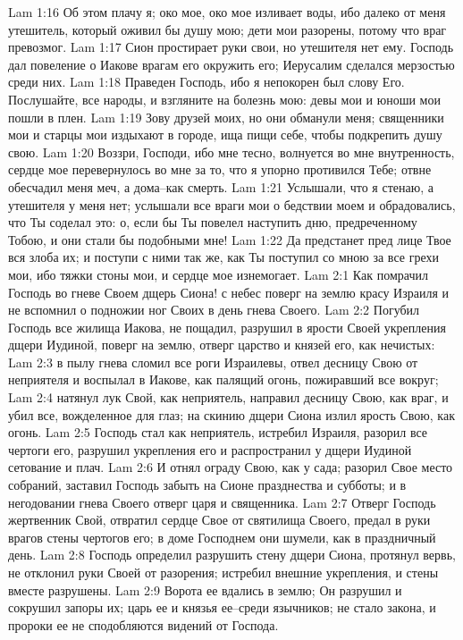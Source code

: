 Lam 1:16  Об этом плачу я; око мое, око мое изливает воды, ибо далеко от меня утешитель, который оживил бы душу мою; дети мои разорены, потому что враг превозмог.
Lam 1:17  Сион простирает руки свои, но утешителя нет ему. Господь дал повеление о Иакове врагам его окружить его; Иерусалим сделался мерзостью среди них.
Lam 1:18  Праведен Господь, ибо я непокорен был слову Его. Послушайте, все народы, и взгляните на болезнь мою: девы мои и юноши мои пошли в плен.
Lam 1:19  Зову друзей моих, но они обманули меня; священники мои и старцы мои издыхают в городе, ища пищи себе, чтобы подкрепить душу свою.
Lam 1:20  Воззри, Господи, ибо мне тесно, волнуется во мне внутренность, сердце мое перевернулось во мне за то, что я упорно противился Тебе; отвне обесчадил меня меч, а дома--как смерть.
Lam 1:21  Услышали, что я стенаю, а утешителя у меня нет; услышали все враги мои о бедствии моем и обрадовались, что Ты соделал это: о, если бы Ты повелел наступить дню, предреченному Тобою, и они стали бы подобными мне!
Lam 1:22  Да предстанет пред лице Твое вся злоба их; и поступи с ними так же, как Ты поступил со мною за все грехи мои, ибо тяжки стоны мои, и сердце мое изнемогает.
Lam 2:1  Как помрачил Господь во гневе Своем дщерь Сиона! с небес поверг на землю красу Израиля и не вспомнил о подножии ног Своих в день гнева Своего.
Lam 2:2  Погубил Господь все жилища Иакова, не пощадил, разрушил в ярости Своей укрепления дщери Иудиной, поверг на землю, отверг царство и князей его, как нечистых:
Lam 2:3  в пылу гнева сломил все роги Израилевы, отвел десницу Свою от неприятеля и воспылал в Иакове, как палящий огонь, пожиравший все вокруг;
Lam 2:4  натянул лук Свой, как неприятель, направил десницу Свою, как враг, и убил все, вожделенное для глаз; на скинию дщери Сиона излил ярость Свою, как огонь.
Lam 2:5  Господь стал как неприятель, истребил Израиля, разорил все чертоги его, разрушил укрепления его и распространил у дщери Иудиной сетование и плач.
Lam 2:6  И отнял ограду Свою, как у сада; разорил Свое место собраний, заставил Господь забыть на Сионе празднества и субботы; и в негодовании гнева Своего отверг царя и священника.
Lam 2:7  Отверг Господь жертвенник Свой, отвратил сердце Свое от святилища Своего, предал в руки врагов стены чертогов его; в доме Господнем они шумели, как в праздничный день.
Lam 2:8  Господь определил разрушить стену дщери Сиона, протянул вервь, не отклонил руки Своей от разорения; истребил внешние укрепления, и стены вместе разрушены.
Lam 2:9  Ворота ее вдались в землю; Он разрушил и сокрушил запоры их; царь ее и князья ее--среди язычников; не стало закона, и пророки ее не сподобляются видений от Господа.
